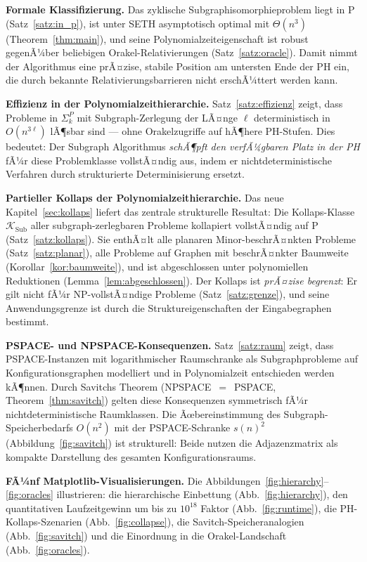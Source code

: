 ﻿\documentclass[a4paper,12pt]{article}
\theoremstyle{definition}
\begin{document}
\textbf{Formale Klassifizierung.}
Das zyklische Subgraphisomorphieproblem liegt in P (Satz~\ref{satz:in_p}),
ist unter SETH asymptotisch optimal mit $\Theta(n^3)$ (Theorem~\ref{thm:main}),
und seine Polynomialzeiteigenschaft ist robust gegenÃ¼ber beliebigen
Orakel-Relativierungen (Satz~\ref{satz:oracle}).
Damit nimmt der Algorithmus eine prÃ¤zise, stabile Position am untersten Ende
der PH ein, die durch bekannte Relativierungsbarrieren nicht erschÃ¼ttert werden kann.

\textbf{Effizienz in der Polynomialzeithierarchie.}
Satz~\ref{satz:effizienz} zeigt, dass Probleme in $\Sigma_k^P$ mit Subgraph-Zerlegung
der LÃ¤nge $\ell$ deterministisch in $O(n^{3\ell})$ lÃ¶sbar sind ---
ohne Orakelzugriffe auf hÃ¶here PH-Stufen. Dies bedeutet: Der Subgraph Algorithmus
\emph{schÃ¶pft den verfÃ¼gbaren Platz in der PH} fÃ¼r diese Problemklasse vollstÃ¤ndig aus,
indem er nichtdeterministische Verfahren durch strukturierte Determinisierung ersetzt.

\textbf{Partieller Kollaps der Polynomialzeithierarchie.}
Das neue Kapitel~\ref{sec:kollaps} liefert das zentrale strukturelle Resultat:
Die Kollaps-Klasse $\mathcal{K}_\mathrm{Sub}$ aller subgraph-zerlegbaren Probleme
kollapiert vollstÃ¤ndig auf P (Satz~\ref{satz:kollaps}).
Sie enthÃ¤lt alle planaren Minor-beschrÃ¤nkten Probleme (Satz~\ref{satz:planar}),
alle Probleme auf Graphen mit beschrÃ¤nkter Baumweite (Korollar~\ref{kor:baumweite}),
und ist abgeschlossen unter polynomiellen Reduktionen (Lemma~\ref{lem:abgeschlossen}).
Der Kollaps ist \emph{prÃ¤zise begrenzt}: Er gilt nicht fÃ¼r NP-vollstÃ¤ndige Probleme
(Satz~\ref{satz:grenze}), und seine Anwendungsgrenze ist durch die
Struktureigenschaften der Eingabegraphen bestimmt.

\textbf{PSPACE- und NPSPACE-Konsequenzen.}
Satz~\ref{satz:raum} zeigt, dass PSPACE-Instanzen mit logarithmischer Raumschranke
als Subgraphprobleme auf Konfigurationsgraphen modelliert und in Polynomialzeit
entschieden werden kÃ¶nnen. Durch Savitchs Theorem (NPSPACE~$=$~PSPACE,
Theorem~\ref{thm:savitch}) gelten diese Konsequenzen symmetrisch fÃ¼r
nichtdeterministische Raumklassen. Die Ãœbereinstimmung des Subgraph-Speicherbedarfs
$O(n^2)$ mit der PSPACE-Schranke $s(n)^2$ (Abbildung~\ref{fig:savitch}) ist
strukturell: Beide nutzen die Adjazenzmatrix als kompakte Darstellung des
gesamten Konfigurationsraums.

\textbf{FÃ¼nf Matplotlib-Visualisierungen.}
Die Abbildungen~\ref{fig:hierarchy}--\ref{fig:oracles} illustrieren:
die hierarchische Einbettung (Abb.~\ref{fig:hierarchy}),
den quantitativen Laufzeitgewinn um bis zu $10^{18}$ Faktor (Abb.~\ref{fig:runtime}),
die PH-Kollaps-Szenarien (Abb.~\ref{fig:collapse}),
die Savitch-Speicheranalogien (Abb.~\ref{fig:savitch}) und
die Einordnung in die Orakel-Landschaft (Abb.~\ref{fig:oracles}).
\end{document}
